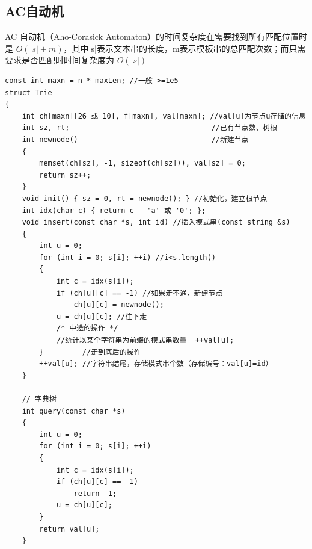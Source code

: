 \documentclass[twoside]{article}
\begin{document}
\subsection{AC自动机}
AC 自动机（Aho-Corasick Automaton）的时间复杂度在需要找到所有匹配位置时是 $O(|s|+m)$，其中|s|表示文本串的长度，m表示模板串的总匹配次数；而只需要求是否匹配时时间复杂度为 $O(|s|)$
\begin{lstlisting}
const int maxn = n * maxLen; //一般 >=1e5
struct Trie
{
    int ch[maxn][26 或 10], f[maxn], val[maxn]; //val[u]为节点u存储的信息
    int sz, rt;                                 //已有节点数、树根
    int newnode()                               //新建节点
    {
        memset(ch[sz], -1, sizeof(ch[sz])), val[sz] = 0;
        return sz++;
    }
    void init() { sz = 0, rt = newnode(); } //初始化，建立根节点
    int idx(char c) { return c - 'a' 或 '0'; };
    void insert(const char *s, int id) //插入模式串(const string &s)
    {
        int u = 0;
        for (int i = 0; s[i]; ++i) //i<s.length()
        {
            int c = idx(s[i]);
            if (ch[u][c] == -1) //如果走不通，新建节点
                ch[u][c] = newnode();
            u = ch[u][c]; //往下走
            /* 中途的操作 */
            //统计以某个字符串为前缀的模式串数量  ++val[u];
        }         //走到底后的操作
        ++val[u]; //字符串结尾，存储模式串个数（存储编号：val[u]=id）
    }

    // 字典树
    int query(const char *s)
    {
        int u = 0;
        for (int i = 0; s[i]; ++i)
        {
            int c = idx(s[i]);
            if (ch[u][c] == -1)
                return -1;
            u = ch[u][c];
        }
        return val[u];
    }


\end{lstlisting}
\end{document}
